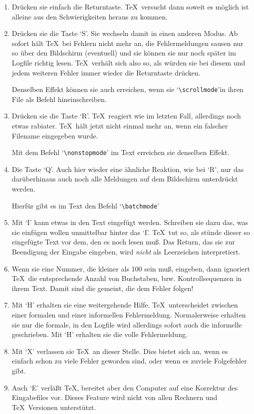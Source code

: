 \begin{enumerate}
\item Dr\"ucken sie einfach die Returntaste. \TeX\ versucht dann soweit
es m\"oglich ist alleine aus den Schwierigkeiten heraus zu kommen.
\item Dr\"ucken sie die Taste `S'. Sie wechseln damit in einen anderen
Modus. Ab sofort h\"alt \TeX\ bei Fehlern nicht mehr an, die
Fehlermeldungen sausen nur so \"uber den 
Bildschirm (eventuell) und sie
k\"onnen sie nur noch sp\"ater im Logfile richtig lesen. \TeX\ verh\"alt
sich also so, als w\"urden sie bei diesem und jedem weiteren Fehler
immer wieder die Returntaste dr\"ucken.

Denselben Effekt k\"onnen sie auch erreichen, wenn sie
`\verb|\scrollmode|'in ihren File als Befehl hineinschreiben.
\item Dr\"ucken sie die Taste `R'. \TeX\ reagiert wie im letzten Fall,
allerdings noch etwas rabiater. \TeX\ h\"alt jetzt nicht einmal mehr an,
wenn ein falscher Filename eingegeben wurde.

Mit dem Befehl 
`\verb|\nonstopmode|' im Text erreichen sie denselben Effekt.
\item Die Taste `Q'. Auch hier wieder eine \"ahnliche Reaktion, wie bei
`R', nur das dar\"uberhinaus auch noch alle Meldungen auf dem
Bildschirm
unterdr\"uckt werden.

Hierf\"ur gibt es im Text den Befehl 
`\verb|\batchmode|'
\item Mit `I' kann etwas in den Text eingef\"ugt werden. Schreiben sie
dazu das, was sie einf\"ugen wollen unmittelbar hinter das `I'. \TeX\
tut so, als st\"unde dieser so eingef\"ugte Text vor dem, den es noch
lesen mu\ss{}. Das Return, das sie zur Beendigung der Eingabe eingeben, wird {\em
nicht} als \index{Leer!Zeichen}Leerzeichen interpretiert.
\item Wenn sie eine Nummer, die kleiner als 100 sein mu\ss{}, eingeben,
dann ignoriert \TeX\ die ent\-sprech\-en\-de Anzahl von Buchstaben, bzw.
\index{Kontrollsequenz}
Kontrollsequenzen in ihrem Text. Damit sind die gemeint, die dem
Fehler folgen!
\item Mit `H' erhalten sie eine weitergehende Hilfe. \TeX\
unterscheidet zwischen einer formalen und einer informellen
Fehlermeldung. Normalerweise erhalten sie nur die formale, in den
\index{File!Log}Logfile wird allerdings sofort auch die informelle geschrieben. Mit
`H' erhalten sie die volle Fehlermeldung.
\item Mit `X' verlassen sie \TeX\ an dieser Stelle. Dies bietet sich
an, wenn es einfach schon zu viele Fehler geworden sind, oder wenn es
zuviele Folgefehler gibt.
\item Auch `E' verl\"a\ss{}t \TeX, bereitet aber den Computer auf eine
Korrektur des Eingabefiles vor. Dieses Feature wird nicht von allen
Rechnern und \TeX\ Versionen unterst\"utzt.
\end{enumerate}
